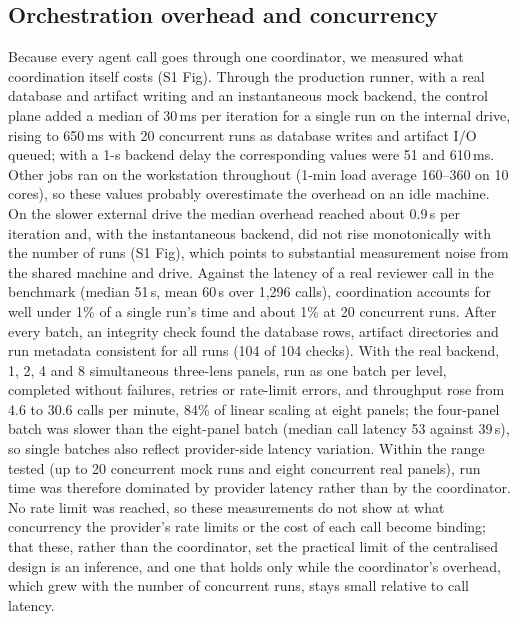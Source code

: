 \subsection*{Orchestration overhead and concurrency}

Because every agent call goes through one coordinator, we measured what coordination itself costs (S1 Fig). Through the production runner, with a real database and artifact writing and an instantaneous mock backend, the control plane added a median of 30\,ms per iteration for a single run on the internal drive, rising to 650\,ms with 20 concurrent runs as database writes and artifact I/O queued; with a 1-s backend delay the corresponding values were 51 and 610\,ms. Other jobs ran on the workstation throughout (1-min load average 160--360 on 10 cores), so these values probably overestimate the overhead on an idle machine. On the slower external drive the median overhead reached about 0.9\,s per iteration and, with the instantaneous backend, did not rise monotonically with the number of runs (S1 Fig), which points to substantial measurement noise from the shared machine and drive. Against the latency of a real reviewer call in the benchmark (median 51\,s, mean 60\,s over 1,296 calls), coordination accounts for well under 1\% of a single run's time and about 1\% at 20 concurrent runs. After every batch, an integrity check found the database rows, artifact directories and run metadata consistent for all runs (104 of 104 checks). With the real backend, 1, 2, 4 and 8 simultaneous three-lens panels, run as one batch per level, completed without failures, retries or rate-limit errors, and throughput rose from 4.6 to 30.6 calls per minute, 84\% of linear scaling at eight panels; the four-panel batch was slower than the eight-panel batch (median call latency 53 against 39\,s), so single batches also reflect provider-side latency variation. Within the range tested (up to 20 concurrent mock runs and eight concurrent real panels), run time was therefore dominated by provider latency rather than by the coordinator. No rate limit was reached, so these measurements do not show at what concurrency the provider's rate limits or the cost of each call become binding; that these, rather than the coordinator, set the practical limit of the centralised design is an inference, and one that holds only while the coordinator's overhead, which grew with the number of concurrent runs, stays small relative to call latency.
